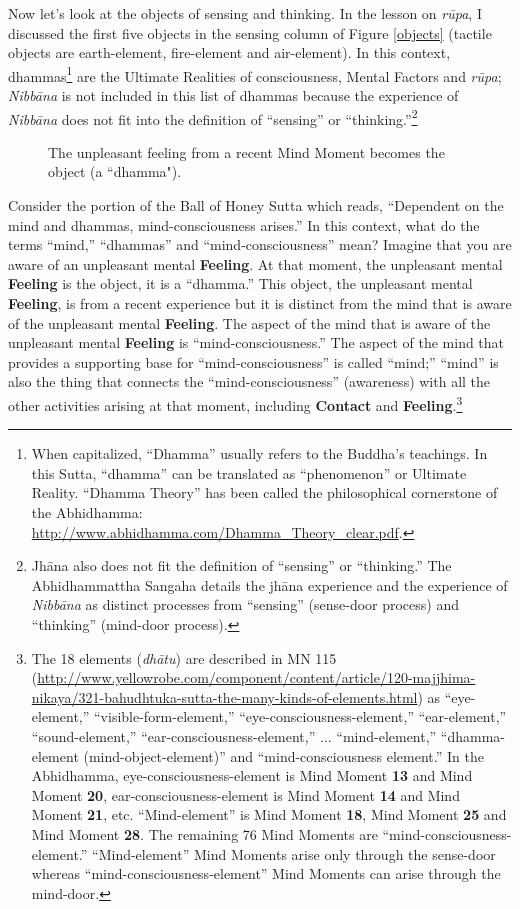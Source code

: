 \pagebreak

Now let’s look at the objects of sensing and thinking. In the lesson on \textit{rūpa}, I discussed the first five objects in the sensing column of Figure \ref{objects} (tactile objects are earth-element, fire-element and air-element). In this context, dhammas\footnote{When capitalized, “Dhamma” usually refers to the Buddha’s teachings. In this Sutta, “dhamma” can be translated as “phenomenon” or Ultimate Reality. “Dhamma Theory” has been called the philosophical cornerstone of the Abhidhamma: \url{http://www.abhidhamma.com/Dhamma_Theory_clear.pdf}.} are the Ultimate Realities of consciousness, Mental Factors and \textit{rūpa}; \textit{Nibbāna} is not included in this list of dhammas because the experience of \textit{Nibbāna} does not fit into the definition of “sensing” or “thinking.”\footnote{Jhāna also does not fit the definition of “sensing” or “thinking.” The Abhidhammattha Sangaha details the jhāna experience and the experience of \textit{Nibbāna} as distinct processes from ``sensing” (sense-door process) and “thinking” (mind-door process).}

\begin{figure}[H]
\centering

\caption{The unpleasant feeling from a recent Mind Moment becomes the object (a ``dhamma").}
\label{fig:Feeling}
\end{figure}

Consider the portion of the Ball of Honey Sutta which reads, “Dependent on the mind and dhammas, mind-consciousness arises.” In this context, what do the terms “mind,” “dhammas” and “mind-consciousness” mean? Imagine that you are aware of an unpleasant mental \textbf{Feeling}. At that moment, the unpleasant mental \textbf{Feeling} is the object, it is a “dhamma.” This object, the unpleasant mental \textbf{Feeling}, is from a recent experience but it is distinct from the mind that is aware of the unpleasant mental \textbf{Feeling}. The aspect of the mind that is aware of the unpleasant mental \textbf{Feeling} is “mind-consciousness.” The aspect of the mind that provides a supporting base for “mind-consciousness” is called “mind;” “mind” is also the thing that connects the “mind-consciousness” (awareness) with all the other activities arising at that moment, including \textbf{Contact} and \textbf{Feeling}.\footnote{The 18 elements (\textit{dhātu}) are described in MN 115 (\url{http://www.yellowrobe.com/component/content/article/120-majjhima-nikaya/321-bahudhtuka-sutta-the-many-kinds-of-elements.html}) as “eye-element,” “visible-form-element,” “eye-consciousness-element,” “ear-element,” “sound-element,” “ear-consciousness-element,” ... “mind-element,” “dhamma-element (mind-object-element)” and “mind-consciousness element.” In the Abhidhamma, eye-consciousness-element is Mind Moment \textbf{13} and Mind Moment \textbf{20}, ear-consciousness-element is Mind Moment \textbf{14} and Mind Moment \textbf{21}, etc. “Mind-element” is Mind Moment \textbf{18}, Mind Moment \textbf{25} and Mind Moment \textbf{28}. The remaining 76 Mind Moments are “mind-consciousness-element.” “Mind-element” Mind Moments arise only through the sense-door whereas “mind-consciousness-element” Mind Moments can arise through the mind-door.}

